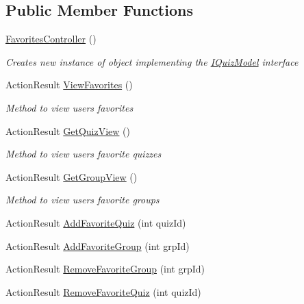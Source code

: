 \subsection*{Public Member Functions}
\begin{DoxyCompactItemize}
\item 
\hyperlink{class_website_1_1_controllers_1_1_favorites_controller_af5029a66b4fcf6ff943ab4e42025b029}{Favorites\+Controller} ()
\begin{DoxyCompactList}\small\item\em Creates new instance of object implementing the \hyperlink{interface_website_1_1_controllers_1_1_i_quiz_model}{I\+Quiz\+Model} interface \end{DoxyCompactList}\item 
Action\+Result \hyperlink{class_website_1_1_controllers_1_1_favorites_controller_a84dfd161ce28ab3cc4a57d7fcc15457e}{View\+Favorites} ()
\begin{DoxyCompactList}\small\item\em Method to view user\textquotesingle{}s favorites \end{DoxyCompactList}\item 
Action\+Result \hyperlink{class_website_1_1_controllers_1_1_favorites_controller_aee9185f5cf7401bf1cb1d29448f06ba0}{Get\+Quiz\+View} ()
\begin{DoxyCompactList}\small\item\em Method to view user\textquotesingle{}s favorite quizzes \end{DoxyCompactList}\item 
Action\+Result \hyperlink{class_website_1_1_controllers_1_1_favorites_controller_a41c29c687732da13b9c79945d3ca5461}{Get\+Group\+View} ()
\begin{DoxyCompactList}\small\item\em Method to view user\textquotesingle{}s favorite groups \end{DoxyCompactList}\item 
Action\+Result \hyperlink{class_website_1_1_controllers_1_1_favorites_controller_a9b8762ca9d3b8a21eb35f5f996964124}{Add\+Favorite\+Quiz} (int quiz\+Id)
\item 
Action\+Result \hyperlink{class_website_1_1_controllers_1_1_favorites_controller_a79498a5c4de9a16d5b92f1648047f2a1}{Add\+Favorite\+Group} (int grp\+Id)
\item 
Action\+Result \hyperlink{class_website_1_1_controllers_1_1_favorites_controller_a32f7dfe3af5297a6ff58248ff58e6c7b}{Remove\+Favorite\+Group} (int grp\+Id)
\item 
Action\+Result \hyperlink{class_website_1_1_controllers_1_1_favorites_controller_a04c7cf12047e5b5d3ae16ee9eb0c004e}{Remove\+Favorite\+Quiz} (int quiz\+Id)
\end{DoxyCompactItemize}
